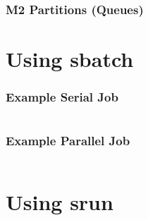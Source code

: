 \documentclass{beamer}
\begin{document}
\begin{frame}
\frametitle{M2 Partitions (Queues)}

\end{frame}

\section{Using sbatch}

\begin{frame}
\frametitle{Example Serial Job}
\inputminted{bash}{examples/matlab/serial.sbatch}
\end{frame}

\begin{frame}
\frametitle{Example Parallel Job}
\inputminted{bash}{examples/cfour/parallel.sbatch}
\end{frame}

\section{Using srun}
\end{document}
